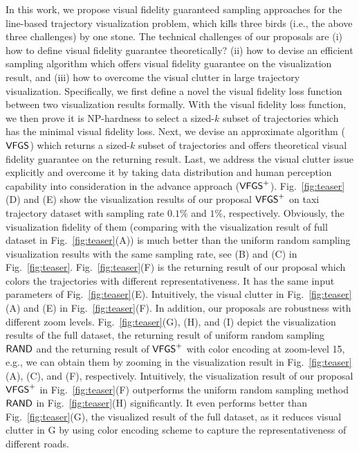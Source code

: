 In this work, we propose visual fidelity guaranteed sampling approaches for the line-based trajectory visualization problem,
which kills three birds (i.e., the above three challenges) by one stone.
The technical challenges of our proposals are
(i) how to define visual fidelity guarantee theoretically?
(ii) how to devise an efficient sampling algorithm which offers visual fidelity guarantee on the visualization result,
and (iii) how to overcome the visual clutter in large trajectory visualization.
Specifically, we first define a novel the visual fidelity loss function between two visualization results formally.
With the visual fidelity loss function, we then prove it is NP-hardness to select a sized-$k$ subset of trajectories which has the minimal visual fidelity loss.
Next, we devise an approximate algorithm ($\mathsf{VFGS}$) which returns a sized-$k$ subset of trajectories and offers theoretical visual fidelity guarantee on the returning result.
Last, we address the visual clutter issue explicitly and overcome it by taking data distribution and human perception capability into consideration in the advance approach ($\mathsf{VFGS}^{+}$).
Fig.~\ref{fig:teaser}(D) and (E) show the visualization results of our proposal $\mathsf{VFGS}^{+}{}$ on \pt{} taxi trajectory dataset with sampling rate $0.1\%$ and $1\%$, respectively.
Obviously, the visualization fidelity of them (comparing with the visualization result of full dataset in Fig.~\ref{fig:teaser}(A)) is much better than
the uniform random sampling visualization results with the same sampling rate, see (B) and (C) in Fig.~\ref{fig:teaser}.
Fig.~\ref{fig:teaser}(F) is the returning result of our proposal which colors the trajectories with different representativeness.
It has the same input parameters of Fig.~\ref{fig:teaser}(E).
Intuitively, the visual clutter in Fig.~\ref{fig:teaser}(A) and (E)  in Fig.~\ref{fig:teaser}(F).
In addition, our proposals are robustness with different zoom levels.
Fig.~\ref{fig:teaser}(G), (H), and (I) depict the visualization results of the full \pt{} dataset, the returning result of uniform random sampling $\mathsf{RAND}$ and the returning result of $\mathsf{VFGS}^{+}$ with color encoding at zoom-level 15, e.g., we can obtain them by zooming in the visualization result in Fig.~\ref{fig:teaser}(A), (C), and (F), respectively.
Intuitively, the visualization result of our proposal $\mathsf{VFGS}^{+}$ in Fig.~\ref{fig:teaser}(F) outperforms the uniform random sampling method $\mathsf{RAND}$ in Fig.~\ref{fig:teaser}(H) significantly.
It even performs better than Fig.~\ref{fig:teaser}(G), the visualized result of the full dataset, as it reduces visual clutter in G by using color encoding scheme to capture the representativeness of different roads.

